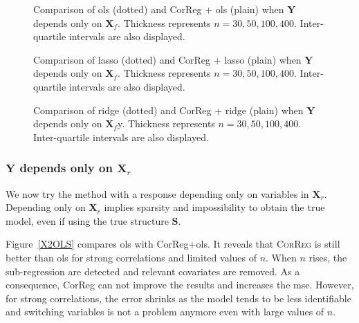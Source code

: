 \documentclass[11pt,a4paper]{article}
\begin{document}
 \begin{figure}[h]
	 \quad
	\caption{Comparison of {\sc ols} (dotted) and {\sc CorReg} + {\sc ols} (plain) when $\boldsymbol{Y}$ depends only on $\boldsymbol{X}_f$. Thickness represents $n=30,50,100,400$.  Inter-quartile intervals are also displayed.}\label{X1OLS}
\end{figure}


\begin{figure}[h]
	 \quad
	\caption{Comparison of {\sc lasso} (dotted) and {\sc CorReg} + {\sc lasso} (plain) when $\boldsymbol{Y}$ depends only on $\boldsymbol{X}_f$. Thickness represents $n=30,50,100,400$.  Inter-quartile intervals are also displayed.}\label{X1lasso}
\end{figure}

\begin{figure}[h]
	 \quad
	\caption{Comparison of ridge (dotted) and {\sc CorReg} + ridge (plain) when $\boldsymbol{Y}$ depends only on $\boldsymbol{X}_f$y. Thickness represents $n=30,50,100,400$.  Inter-quartile intervals are also displayed.}\label{X1ridge}
\end{figure}

\subsubsection{$\boldsymbol{Y}$ depends only on $\boldsymbol{X}_r$}	 \label{tableMSEsimgauche}
We now try the method with a response depending only on variables in $\boldsymbol{X}_r$.
Depending only on $\boldsymbol{X}_r$ implies sparsity and impossibility to obtain the true model, even if using the true structure $\boldsymbol{S}$.

Figure~\ref{X2OLS} compares {\sc ols} with {\sc CorReg}+{\sc ols}. It reveals that \textsc{CorReg} is still better than {\sc ols} for strong correlations and limited values of $n$. When $n$ rises, the sub-regression are detected and relevant covariates are removed. As a consequence, {\sc CorReg} can not improve the results and increases the {\sc mse}. However, for strong correlations, the error shrinks as the model tends to be less identifiable and switching variables is not a problem anymore even with large values of $n$.
\end{document}
